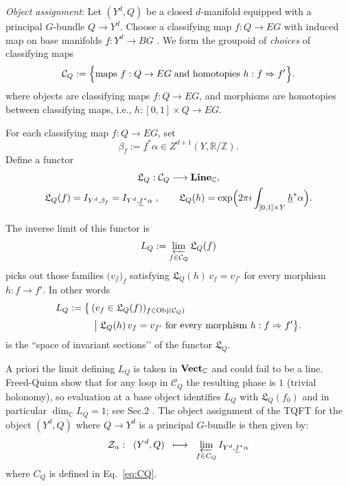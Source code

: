 \documentclass[aps,prx,reprint,superscriptaddress,twocolumn,amsmath,amssymb,amsfonts, nofootinbib]{revtex4-2}
\newcommand{\vect}{{\bf Vect}_{\mathbb{C}}}
\newcommand{\Line}{{\bf Line}_{\mathbb{C}}}
\theoremstyle{apsstyle}
\begin{document}
\bigskip 

\noindent \textit{Object assignment}:
Let $(Y^{d},Q)$ be a closed $d$-manifold equipped with a principal
$G$-bundle $Q \to Y^{d}$. Choose a classifying map $f:Q\to EG$ with induced map on base manifolds $\underline{f}: Y^{d}\to BG$ . We form the groupoid of \textit{choices} of classifying maps
\begin{align}
\label{eq:CQ}
  \mathcal C_{Q}
  :=\Bigl\{\text{maps }f: Q\to EG \;\text{and homotopies }h:f \Rightarrow  f'\Bigr\}.
\end{align}
\noindent where objects are classifying maps $f:Q\to EG$, and morphisms are homotopies between classifying maps, i.e., $h:[0,1]\times Q \to EG$.

\medskip 

\noindent For each classifying map $f:Q\to EG$, set
\begin{equation*}
    \beta_f:=\underline f^{*}\alpha
    \in Z^{d+1}(Y,\mathbb R/\mathbb Z).
\end{equation*}
Define a functor
\begin{gather*}
   \mathfrak L_{Q}:\mathcal C_{Q} \longrightarrow \Line,\\
   \mathfrak L_{Q}(f)=I_{Y^{d},\beta_f}
   =I_{Y^{d},\underline f^{*}\alpha}\;,\qquad
   \mathfrak L_{Q}(h)=
      \exp \Bigl(
        2\pi i \int_{[0,1]\times Y}\underline{h}^{*}\alpha
      \Bigr).
\end{gather*}

\noindent The inverse limit of this functor is 
\begin{equation*}
   L_{Q}:=\varprojlim_{f\in\mathcal C_{Q}}\mathfrak L_{Q}(f)
\end{equation*}
\noindent picks out those families $\bigl(v_{f}\bigr)_{f}$ satisfying 
$\mathfrak L_{Q}(h)\,v_{f}=v_{f'}$ for every morphism $h:f \to f'.$ In other words
\begin{equation*}
\begin{aligned}
L_{Q}:=\bigl\{\,&
  (v_{f}\in \mathfrak L_{Q}(f))_{f\in\mathrm{Obj}(\mathcal C_{Q})}
  \\[2pt]
  &\bigm| \mathfrak L_{Q}(h)\,v_{f}=v_{f'}
     \text{ for every morphism }h:f \Rightarrow f' \bigr\}.
\end{aligned}
\end{equation*}
\noindent is the “space of invariant sections’’ of the functor $\mathfrak L_{Q}$.

\bigskip 

\noindent A priori the limit defining $L_Q$ is taken in $\vect$ and could fail to be a line. Freed-Quinn show that for any loop in $\mathcal C_Q$ the resulting phase is $1$ (trivial holonomy), so evaluation at a base object identifies $L_Q$ with $\mathfrak L_Q(f_0)$ and in particular $\dim_{\mathbb C}L_Q=1$; see Sec.2 \cite{FreedQuinn}. The object assignment of the TQFT for the object $(Y^{d},Q)$ where $Q\to Y^{d}$ is a principal $G$-bundle is then given by:
\begin{equation*}
    \mathcal{Z}_{\alpha}:\;\;(Y^{d},Q) \;\; \longmapsto \;\; \varprojlim_{f\in C_{Q}} I_{Y^{d}, \underline{f}^{*}\alpha}
\end{equation*}
where $C_{Q}$ is defined in Eq.~\ref{eq:CQ}.
\end{document}
